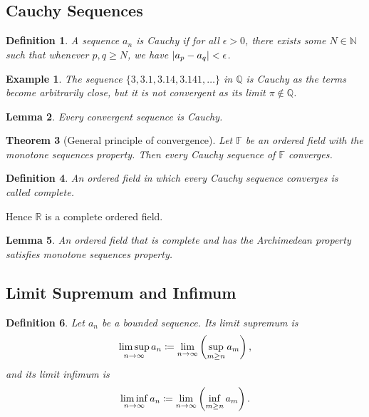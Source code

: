 \documentclass{article}
\theoremstyle{plain}\theoremheaderfont{\normalfont\itshape}\theorembodyfont{\rmfamily}\theoremseparator{.}\newtheorem*{rem}{Remark}\newtheorem*{ex}{Example}\newtheorem*{proof}{Proof}\newtheorem*{altp}{Alternative proof}
\theoremstyle{plain}\theoremheaderfont{\normalfont\bfseries}\theorembodyfont{\rmfamily}\theoremseparator{.}\newtheorem{thm}{Theorem}[section]\newtheorem{lem}[thm]{Lemma}\newtheorem{prop}[thm]{Proposition}\newtheorem*{cor}{Corollary}\newtheorem{defn}[thm]{Definition}\newtheorem{clm}[thm]{Claim}\newtheorem{clminproof}{Claim}
\theoremstyle{break}\theoremheaderfont{\normalfont\itshape}\theorembodyfont{\rmfamily}\theoremseparator{.\medskip}\newtheorem*{proofskip}{Proof}\newtheorem*{exs}{Examples}\newtheorem*{rems}{Remarks}
\theoremstyle{break}\theoremheaderfont{\normalfont\bfseries}\theorembodyfont{\rmfamily}\theoremseparator{.\medskip}\newtheorem{lemskip}[thm]{Lemma}\newtheorem{defnskip}[thm]{Definition}\newtheorem{propskip}[thm]{Proposition}\newtheorem{thmskip}[thm]{Theorem}
\begin{document}
    \subsection{Cauchy Sequences}
    \begin{defn}
        A sequence \(a_n\) is \textit{Cauchy} if for all \(\epsilon>0\), there exists some \(N\in \mathbb{N}\) such that whenever \(p,q\ge N\), we have \(\abs{a_p-a_q}<\epsilon\).
    \end{defn}
    \begin{ex}
        The sequence \(\{3,3.1,3.14,3.141,\dots\}\) in \(\mathbb{Q}\) is Cauchy as the terms become arbitrarily close, but it is not convergent as its limit \(\pi\notin\mathbb{Q}\).
    \end{ex}
    \begin{lem}
        Every convergent sequence is Cauchy.
    \end{lem}
    \begin{thm}[General principle of convergence]
        Let \(\mathbb{F}\) be an ordered field with the monotone sequences property. Then every Cauchy sequence of \(\mathbb{F}\) converges.
    \end{thm}
    \begin{defn}
        An ordered field in which every Cauchy sequence converges is called \textit{complete}.
    \end{defn}
    Hence \(\mathbb{R}\) is a complete ordered field.
    \begin{lem}
        An ordered field that is complete and has the Archimedean property satisfies monotone sequences property.
    \end{lem}
    \subsection{Limit Supremum and Infimum}
    \begin{defn}
        Let \(a_n\) be a bounded sequence. Its \textit{limit supremum} is
        \[\limsup_{n\to\infty}a_n\coloneqq\lim_{n\to\infty}\qty(\sup_{m\ge n}a_m)\,,\]
        and its \textit{limit infimum} is
        \[\liminf_{n\to\infty}a_n\coloneqq\lim_{n\to\infty}\qty(\inf_{m\ge n}a_m)\,.\]
    \end{defn}
\end{document}
